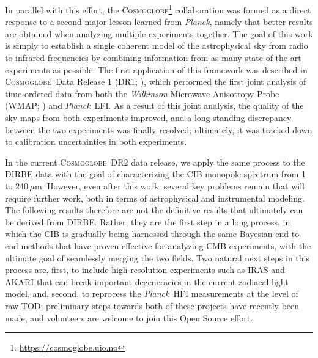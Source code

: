 \documentclass{aa}
\def\Cosmoglobe{\textsc{Cosmoglobe}}
\def\Planck{\textit{Planck}}
\newcommand{\cosmoglobe}{\textsc{Cosmoglobe}}
\begin{document}
In parallel with this effort, the \Cosmoglobe\footnote{\url{https://cosmoglobe.uio.no}} collaboration was formed as a direct response to a second major lesson learned from \Planck, namely that better results are obtained when analyzing multiple experiments together. The goal of this work is simply to establish a single coherent model of the astrophysical sky from radio to infrared frequencies by combining information from as many state-of-the-art experiments as possible. The first application of this framework was described in \cosmoglobe\ Data Release 1 (DR1; \citealp{watts2023_dr1}), which performed the first joint analysis of time-ordered data from both the \textit{Wilkinson} Microwave Anisotropy Probe (WMAP; \citealp{bennett2012}) and \Planck\ LFI. As a result of this joint analysis, the quality of the sky maps from both experiments improved, and a long-standing discrepancy between the two experiments was finally resolved; ultimately, it was tracked down to calibration uncertainties in both experiments.

In the current \cosmoglobe\ DR2 data release, we apply the same process to the DIRBE data with the goal of characterizing the CIB monopole spectrum from 1 to 240$\,\mu\mathrm{m}$. However, even after this work, several key problems remain that will require further work, both in terms of astrophysical and instrumental modeling. The following results therefore are not the definitive results that ultimately can be derived from DIRBE. Rather, they are the first step in a long process, in which the CIB is gradually being harnessed through the same Bayesian end-to-end methods that have proven effective for analyzing CMB experiments, with the ultimate goal of seamlessly merging the two fields. Two natural next steps in this process are, first, to include high-resolution experiments such as IRAS \citep{neugebauer:1984} and AKARI \citep{murakami:2007} that can break important degeneracies in the current zodiacal light model, and, second, to reprocess the \Planck\ HFI measurements at the level of raw TOD; preliminary steps towards both of these projects have recently been made, and volunteers are welcome to join this Open Source effort.

\end{document}

